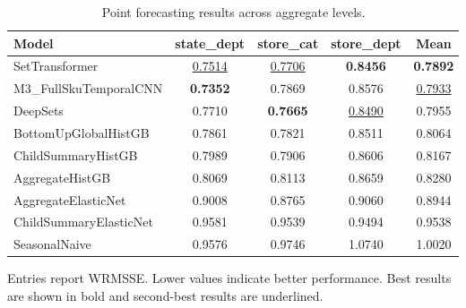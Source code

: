 \begin{table}[H]
\centering
\caption{Point forecasting results across aggregate levels.}
\label{tab:main_point}
\begin{threeparttable}
\begin{tabular}{lcccc}
\toprule
Model & state\_dept & store\_cat & store\_dept & Mean \\
\midrule
SetTransformer & \underline{0.7514} & \underline{0.7706} & \textbf{0.8456} & \textbf{0.7892} \\
M3\_FullSkuTemporalCNN & \textbf{0.7352} & 0.7869 & 0.8576 & \underline{0.7933} \\
DeepSets & 0.7710 & \textbf{0.7665} & \underline{0.8490} & 0.7955 \\
BottomUpGlobalHistGB & 0.7861 & 0.7821 & 0.8511 & 0.8064 \\
ChildSummaryHistGB & 0.7989 & 0.7906 & 0.8606 & 0.8167 \\
AggregateHistGB & 0.8069 & 0.8113 & 0.8659 & 0.8280 \\
AggregateElasticNet & 0.9008 & 0.8765 & 0.9060 & 0.8944 \\
ChildSummaryElasticNet & 0.9581 & 0.9539 & 0.9494 & 0.9538 \\
SeasonalNaive & 0.9576 & 0.9746 & 1.0740 & 1.0020 \\
\bottomrule
\end{tabular}
\begin{tablenotes}
\footnotesize \item Entries report WRMSSE. Lower values indicate better performance. Best results are shown in bold and second-best results are underlined.
\end{tablenotes}
\end{threeparttable}
\end{table}
